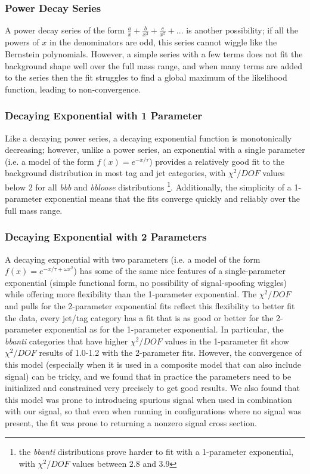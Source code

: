 \subsubsection{Power Decay Series}
A power decay series of the form $\frac{a}{x} + \frac{b}{x^3} + \frac{c}{x^5} + ...$
is another possibility; if all the powers of $x$ in the denominators are
odd, this series cannot wiggle like the Bernstein polynomials.  However,
a simple series with a few terms does not fit the background shape well 
over the full mass range, and when many terms are added to the series then
the fit struggles to find a global maximum of the likelihood function, leading
to non-convergence.

\subsubsection{Decaying Exponential with 1 Parameter}
Like a decaying power series, a decaying exponential function is monotonically
decreasing; however, unlike a power series, an exponential with a single
parameter (i.e. a model of the form $f(x)=e^{-x/\tau}$) provides 
a relatively good fit to the background distribution in most tag and jet
categories, with $\chi^2/DOF$ values below 2 for all \textit{bbb} and \textit{bbloose}
distributions \footnote{the \textit{bbanti} distributions prove harder to
fit with a 1-parameter exponential, with $\chi^2/DOF$ values between 2.8 and 3.9}.
Additionally, the simplicity of a 1-parameter exponential means that the
fits converge quickly and reliably over the full mass range.

\subsubsection{Decaying Exponential with 2 Parameters}
A decaying exponential with two parameters (i.e. a model of the form  $f(x)=e^{-x/\tau+\omega x^2}$)
has some of the same nice features of a single-parameter exponential (simple functional
form, no possibility of signal-spoofing wiggles) while offering
more flexibility than the 1-parameter exponential.  The $\chi^2/DOF$ and pulls
for the 2-parameter exponential fits reflect this flexibility to better
fit the data, every jet/tag category has a fit that is as good or better
for the 2-parameter exponential as for the 1-parameter exponential.  In 
particular, the \textit{bbanti} categories that have higher $\chi^2/DOF$ values
in the 1-parameter fit show $\chi^2/DOF$ results of 1.0-1.2 with the 2-parameter fits. 
However, the convergence of this model (especially when it is used in a composite
model that can also include signal) can be tricky, and we found that in practice
the parameters need to be initialized and constrained very precisely to get
good results.  We also found that this model was prone to introducing spurious
signal when used in combination with our signal, so that even when running in 
configurations where no signal was present, the fit was prone to returning
a nonzero signal cross section.


